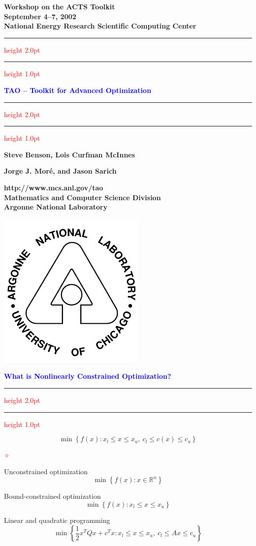 \documentclass{seminar}
\newcommand{\R}{\mbox{${\mathbb R}$}}
\newcommand{\half}{{\textstyle{\frac{1}{2}}}}
\newcommand{\reddiamond}{\textcolor{red}{$\diamond$}}
\newcommand{\redstripe}{\textcolor{red}{\hrule height 2.0pt\hfil}
             \vspace{-1.8pt}
             \textcolor{red}{\hrule height 1.0pt\hfil}
}
\newcommand{\heading}[1]{%
   \centerline{\textcolor{blue}{\textbf{#1}}}%
    \redstripe%
    \bigskip
}
\begin{document}
\begin{slide}

\begin{center}
{\bf
Workshop on the ACTS Toolkit \\
September 4--7, 2002 \\
National Energy Research Scientific Computing Center
}
\end{center}

\redstripe

\begin{center}
{\bf
\textcolor{blue}{TAO -- Toolkit for Advanced Optimization}
}

\redstripe

\medskip

\centerline{\bf Steve Benson, Lois Curfman McInnes} 
\centerline{\bf Jorge J. Mor\'e, and Jason Sarich}

\end{center}


\parbox[b]{3in}{\bf http://www.mcs.anl.gov/tao \bigskip \\
\small  Mathematics and Computer Science Division \\ 
Argonne National Laboratory} \includegraphics[scale=0.5]{../images//argonne}

\end{slide}


\begin{slide}

\heading{What is Nonlinearly Constrained Optimization?}

\[
\min \left \{ f(x): x_l \le x \le x_u , \ c_l \le c(x) \le c_u \right \}
\]

\medskip

\begin{list}{\reddiamond}
{
}
\item
Unconstrained optimization
\[
\min \left \{  f(x) : x \in \R^n \right \}
\]
\item
Bound-constrained optimization
\[
\min \left \{  f(x) : x_l \le x \le x_u \right \}
\]
\item
Linear and quadratic programming
\[
\min \left \{ \half x^T Q x + c^T x : x_l \le x \le x_u , 
\ c_l \le Ax \le c_u \right \}
\]
\end{list}

\vfill

\end{slide}
\end{document}
